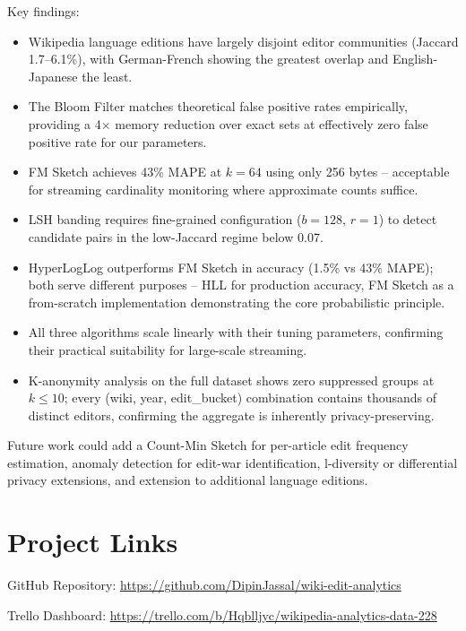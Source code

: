 \documentclass[conference]{IEEEtran}
\begin{document}
Key findings:
\begin{itemize}
  \item Wikipedia language editions have largely disjoint editor communities (Jaccard 1.7--6.1\%), with German-French showing the greatest overlap and English-Japanese the least.
  \item The Bloom Filter matches theoretical false positive rates empirically, providing a 4$\times$ memory reduction over exact sets at effectively zero false positive rate for our parameters.
  \item FM Sketch achieves 43\% MAPE at $k=64$ using only 256 bytes -- acceptable for streaming cardinality monitoring where approximate counts suffice.
  \item LSH banding requires fine-grained configuration ($b=128$, $r=1$) to detect candidate pairs in the low-Jaccard regime below 0.07.
  \item HyperLogLog outperforms FM Sketch in accuracy (1.5\% vs 43\% MAPE); both serve different purposes -- HLL for production accuracy, FM Sketch as a from-scratch implementation demonstrating the core probabilistic principle.
  \item All three algorithms scale linearly with their tuning parameters, confirming their practical suitability for large-scale streaming.
  \item K-anonymity analysis on the full dataset shows zero suppressed groups at $k \leq 10$; every (wiki, year, edit\_bucket) combination contains thousands of distinct editors, confirming the aggregate is inherently privacy-preserving.
\end{itemize}

Future work could add a Count-Min Sketch for per-article edit frequency estimation, anomaly detection for edit-war identification, l-diversity or differential privacy extensions, and extension to additional language editions.

\section*{Project Links}

\noindent GitHub Repository: \url{https://github.com/DipinJassal/wiki-edit-analytics}

\noindent Trello Dashboard: \url{https://trello.com/b/Hqblljyc/wikipedia-analytics-data-228}
\end{document}
